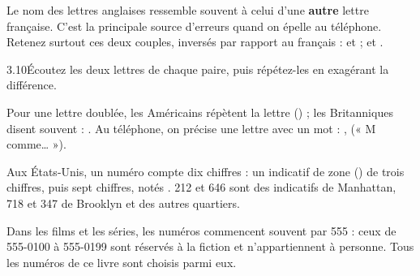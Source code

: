 \begin{attention}
\par{}
\end{attention}


Le nom des lettres anglaises ressemble souvent à celui d'une \textbf{autre} lettre française.
C'est la principale source d'erreurs quand on épelle au téléphone. Retenez surtout ces deux
couples, inversés par rapport au français :   et   ;
  et  .

\begin{paires}{3.10}{Écoutez les deux lettres de chaque paire, puis répétez-les en exagérant la
différence.}
\end{paires}

\begin{astuce}
Pour une lettre doublée, les Américains répètent la lettre () ; les
Britanniques disent souvent  : . Au téléphone, on précise une lettre avec
un mot : ,  (« M comme… »).
\end{astuce}


\begin{paire}
\begin{culture}
Aux États-Unis, un numéro compte dix chiffres : un indicatif de zone () de trois
chiffres, puis sept chiffres, notés . 212 et 646 sont des indicatifs de
Manhattan, 718 et 347 de Brooklyn et des autres quartiers.
\end{culture}
\begin{culture}[Le 555 du cinéma]
Dans les films et les séries, les numéros commencent souvent par 555 : ceux de 555-0100 à
555-0199 sont réservés à la fiction et n'appartiennent à personne. Tous les numéros de ce livre
sont choisis parmi eux.
\end{culture}
\end{paire}

